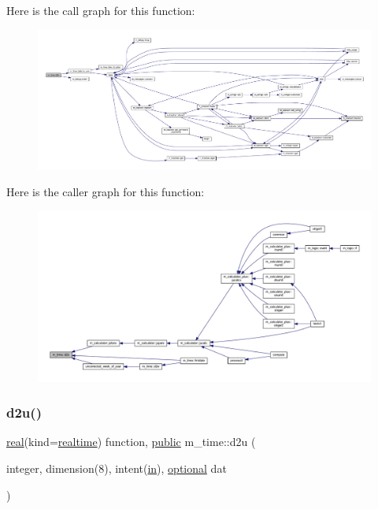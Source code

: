 Here is the call graph for this function\+:
\nopagebreak
\begin{figure}[H]
\begin{center}
\leavevmode
\includegraphics[width=350pt]{namespacem__time_a727dd77bbd4a5d0e3947c5d303845947_cgraph}
\end{center}
\end{figure}
Here is the caller graph for this function\+:
\nopagebreak
\begin{figure}[H]
\begin{center}
\leavevmode
\includegraphics[width=350pt]{namespacem__time_a727dd77bbd4a5d0e3947c5d303845947_icgraph}
\end{center}
\end{figure}
\mbox{\label{namespacem__time_a1506e2889a156387df4481ed0534be81}} 
\subsubsection{\texorpdfstring{d2u()}{d2u()}}
{\footnotesize\ttfamily \hyperlink{read__watch_83_8txt_abdb62bde002f38ef75f810d3a905a823}{real}(kind=\hyperlink{namespacem__time_ac10ea9e8d59ec74eaa7d89f2517d7422}{realtime}) function, \hyperlink{M__stopwatch_83_8txt_a2f74811300c361e53b430611a7d1769f}{public} m\+\_\+time\+::d2u (\begin{DoxyParamCaption}\item[{integer, dimension(8), intent(\hyperlink{M__journal_83_8txt_afce72651d1eed785a2132bee863b2f38}{in}), \hyperlink{option__stopwatch_83_8txt_aa4ece75e7acf58a4843f70fe18c3ade5}{optional}}]{dat }\end{DoxyParamCaption})}




